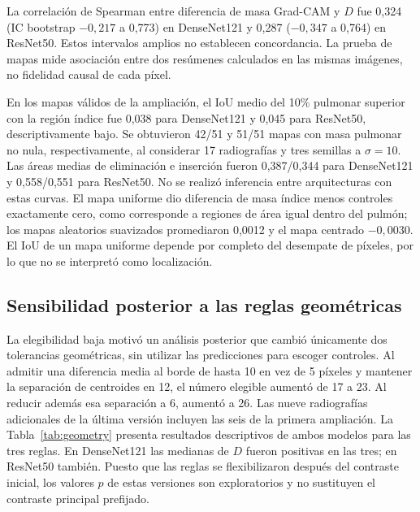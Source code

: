 \documentclass[conference]{IEEEtran}
\begin{document}
La correlación de Spearman entre diferencia de masa Grad-CAM y $D$ fue 0,324 (IC bootstrap $-0,217$ a 0,773) en DenseNet121 y 0,287 ($-0,347$ a 0,764) en ResNet50. Estos intervalos amplios no establecen concordancia. La prueba de mapas mide asociación entre dos resúmenes calculados en las mismas imágenes, no fidelidad causal de cada píxel.

En los mapas válidos de la ampliación, el IoU medio del 10\% pulmonar superior con la región índice fue 0,038 para DenseNet121 y 0,045 para ResNet50, descriptivamente bajo. Se obtuvieron 42/51 y 51/51 mapas con masa pulmonar no nula, respectivamente, al considerar 17 radiografías y tres semillas a $\sigma=10$. Las áreas medias de eliminación e inserción fueron 0,387/0,344 para DenseNet121 y 0,558/0,551 para ResNet50. No se realizó inferencia entre arquitecturas con estas curvas. El mapa uniforme dio diferencia de masa índice menos controles exactamente cero, como corresponde a regiones de área igual dentro del pulmón; los mapas aleatorios suavizados promediaron 0,0012 y el mapa centrado $-0,0030$. El IoU de un mapa uniforme depende por completo del desempate de píxeles, por lo que no se interpretó como localización.

\subsection{Sensibilidad posterior a las reglas geométricas}
La elegibilidad baja motivó un análisis posterior que cambió únicamente dos tolerancias geométricas, sin utilizar las predicciones para escoger controles. Al admitir una diferencia media al borde de hasta 10 en vez de 5 píxeles y mantener la separación de centroides en 12, el número elegible aumentó de 17 a 23. Al reducir además esa separación a 6, aumentó a 26. Las nueve radiografías adicionales de la última versión incluyen las seis de la primera ampliación. La Tabla~\ref{tab:geometry} presenta resultados descriptivos de ambos modelos para las tres reglas. En DenseNet121 las medianas de $D$ fueron positivas en las tres; en ResNet50 también. Puesto que las reglas se flexibilizaron después del contraste inicial, los valores $p$ de estas versiones son exploratorios y no sustituyen el contraste principal prefijado.

\begin{table}[t]\centering\caption{Sensibilidad geométrica posterior. Las reglas se expresan como tolerancia de distancia al borde/separación mínima de centroides en píxeles. IoU máx. med. es la mediana entre radiografías del máximo solapamiento de dos controles; la brecha es la mediana de la diferencia media de distancia al borde. Los $p$ de las dos reglas ampliadas son exploratorios y sin ajuste por selección de protocolo.}\label{tab:geometry}\footnotesize
\end{table}
\end{document}
